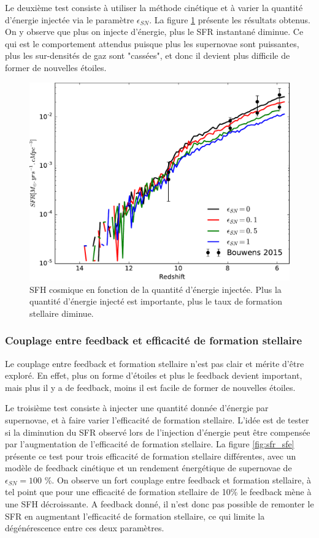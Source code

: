 Le deuxième test consiste à utiliser la méthode cinétique et à varier la quantité d'énergie injectée via le paramètre $\epsilon_{SN}$.
La figure \ref{fig:sfr_egy} présente les résultats obtenus.
On y observe que plus on injecte d'énergie, plus le \ac{SFR} instantané diminue.
Ce qui est le comportement attendus puisque plus les supernovae sont puissantes, plus les sur-densités de gaz sont "cassées", et donc il devient plus difficile de former de nouvelles étoiles.

\begin{figure}
        \includegraphics[width=.95\textwidth]{img/03/sedov/sneff_SFR.pdf} 
        \caption[SFH cosmique en fonction de la quantité d'énergie injectée]{SFH cosmique en fonction de la quantité d'énergie injectée. 
        Plus la quantité d'énergie injecté est importante, plus le taux de formation stellaire diminue.
        }
 		\label{fig:sfr_egy}
\end{figure}

\subsubsection{Couplage entre feedback et efficacité de formation stellaire}

Le couplage entre feedback et formation stellaire n'est pas clair et mérite d'être exploré.
En effet, plus on forme d'étoiles et plus le feedback devient important, mais plus il y a de feedback, moins il est facile de former de nouvelles étoiles.

Le troisième test consiste à injecter une quantité donnée d'énergie par supernovae, et à faire varier l'efficacité de formation stellaire.
L'idée est de tester si la diminution du SFR observé lors de l'injection d'énergie peut être compensée par l'augmentation de l'efficacité de formation stellaire.
La figure \ref{fig:sfr_sfe} présente ce test pour trois efficacité de formation stellaire différentes, avec un modèle de feedback cinétique et un rendement énergétique de supernovae de $\epsilon_{SN}=100$ \%.
On observe un fort couplage entre feedback et formation stellaire, à tel point que pour une efficacité de formation stellaire de 10\% le feedback mène à une \ac{SFH} décroissante.
A feedback donné, il n'est donc pas possible de remonter le \ac{SFR} en augmentant l'efficacité de formation stellaire, ce qui limite la dégénérescence entre ces deux paramètres.

